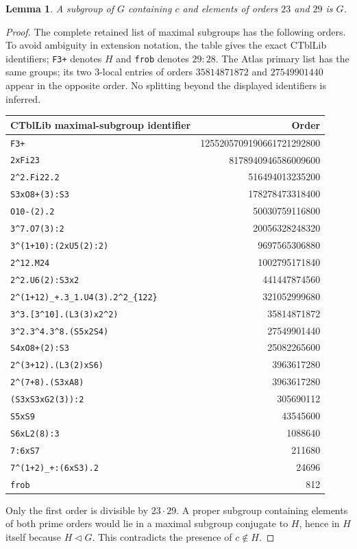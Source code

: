 \documentclass[11pt]{article}
\newtheorem{lemma}{Lemma}
\begin{document}
\begin{lemma}\label{lem:generation}
A subgroup of $G$ containing $c$ and elements of orders $23$ and $29$ is $G$.
\end{lemma}
\begin{proof}
The complete retained list of maximal subgroups has the following orders. To avoid ambiguity in extension notation, the table gives the exact CTblLib identifiers; \texttt{F3+} denotes $H$ and \texttt{frob} denotes $29:28$. The Atlas primary list has the same groups; its two $3$-local entries of orders $35814871872$ and $27549901440$ appear in the opposite order. No splitting beyond the displayed identifiers is inferred.
\begin{center}\small
\begin{tabular}{lr}\toprule
CTblLib maximal-subgroup identifier&Order\\\midrule
\texttt{F3+}&1255205709190661721292800\\
\texttt{2xFi23}&8178940946586009600\\
\texttt{2\^{}2.Fi22.2}&516494013235200\\
\texttt{S3xO8+(3):S3}&178278473318400\\
\texttt{O10-(2).2}&50030759116800\\
\texttt{3\^{}7.O7(3):2}&20056328248320\\
\texttt{3\^{}(1+10):(2xU5(2):2)}&9697565306880\\
\texttt{2\^{}12.M24}&1002795171840\\
\texttt{2\^{}2.U6(2):S3x2}&441447874560\\
\texttt{2\^{}(1+12)\_+.3\_1.U4(3).2\^{}2\_\{122\}}&321052999680\\
\texttt{3\^{}3.[3\^{}10].(L3(3)x2\^{}2)}&35814871872\\
\texttt{3\^{}2.3\^{}4.3\^{}8.(S5x2S4)}&27549901440\\
\texttt{S4xO8+(2):S3}&25082265600\\
\texttt{2\^{}(3+12).(L3(2)xS6)}&3963617280\\
\texttt{2\^{}(7+8).(S3xA8)}&3963617280\\
\texttt{(S3xS3xG2(3)):2}&305690112\\
\texttt{S5xS9}&43545600\\
\texttt{S6xL2(8):3}&1088640\\
\texttt{7:6xS7}&211680\\
\texttt{7\^{}(1+2)\_+:(6xS3).2}&24696\\
\texttt{frob}&812\\\bottomrule
\end{tabular}
\end{center}
Only the first order is divisible by $23\cdot29$. A proper subgroup containing elements of both prime orders would lie in a maximal subgroup conjugate to $H$, hence in $H$ itself because $H\lhd G$. This contradicts the presence of $c\notin H$.
\end{proof}
\end{document}
